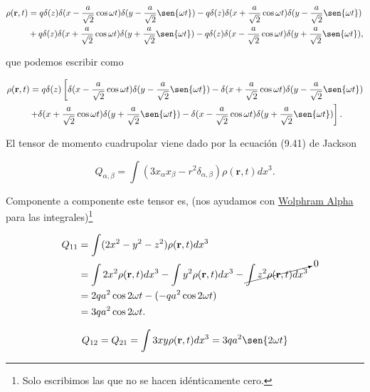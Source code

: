\documentclass[a4paper,11pt]{article}
\numberwithin{equation}{section}
\newcommand{\zerodel}{.\kern-\nulldelimiterspace}
\begin{document}
\begin{align*}
 \rho(\mathbf{r},t) &= q\delta(z)\delta(x - \frac{a}{\sqrt{2}}\cos{\omega t}) 
 \delta(y - \frac{a}{\sqrt{2}}\sen{\omega t}) - 
 q\delta(z)\delta(x + \frac{a}{\sqrt{2}}\cos{\omega t}) 
 \delta(y - \frac{a}{\sqrt{2}}\sen{\omega t}) \\
 &+ q\delta(z)\delta(x + \frac{a}{\sqrt{2}}\cos{\omega t}) 
 \delta(y + \frac{a}{\sqrt{2}}\sen{\omega t}) - 
 q\delta(z)\delta(x - \frac{a}{\sqrt{2}}\cos{\omega t}) 
 \delta(y + \frac{a}{\sqrt{2}}\sen{\omega t}),
\end{align*}

que podemos escribir como 

\begin{align*}
 \rho(\mathbf{r},t) &= q\delta(z)\left[\delta(x - \frac{a}{\sqrt{2}}\cos{\omega t}) 
 \delta(y - \frac{a}{\sqrt{2}}\sen{\omega t}) - 
 \delta(x + \frac{a}{\sqrt{2}}\cos{\omega t}) 
 \delta(y - \frac{a}{\sqrt{2}}\sen{\omega t}) \right\zerodel\\
 &\left\zerodel +\delta(x + \frac{a}{\sqrt{2}}\cos{\omega t}) 
 \delta(y + \frac{a}{\sqrt{2}}\sen{\omega t}) - 
 \delta(x - \frac{a}{\sqrt{2}}\cos{\omega t}) 
 \delta(y + \frac{a}{\sqrt{2}}\sen{\omega t})\right].
\end{align*}

El tensor de momento cuadrupolar viene dado por la ecuación (9.41) de Jackson \cite{jackson} 

\begin{equation}
 Q_{\alpha,\beta} = \int (3x_\alpha x_\beta - r^2 \delta_{\alpha,\beta}) 
 \rho(\mathbf{r},t) dx^3.
\end{equation}

Componente a componente este tensor es, (nos ayudamos con 
\href{http://www.wolframalpha.com/}{Wolphram Alpha} para las integrales)\footnote{Solo 
escribimos las que no se hacen idénticamente cero.}

\begin{align*}
 Q_{11} &= \int (2x^2 - y^2 - z^2)\rho(\mathbf{r},t) dx^3 \\
 &= \int 2 x^2 \rho(\mathbf{r},t) dx^3 
 - \int y^2 \rho(\mathbf{r},t) dx^3 - \cancelto{0}{\int z^2\rho(\mathbf{r},t) dx^3} \\
 &= 2 q a^2 \cos{2\omega t} - (- q a^2 \cos{2\omega t})\\
 &= 3 q a^2 \cos{2\omega t}.
\end{align*}

\begin{align*}
 Q_{12} = Q_{21} = \int 3xy \rho(\mathbf{r},t) dx^3 = 3qa^2\sen{2\omega t}
\end{align*}
\end{document}

